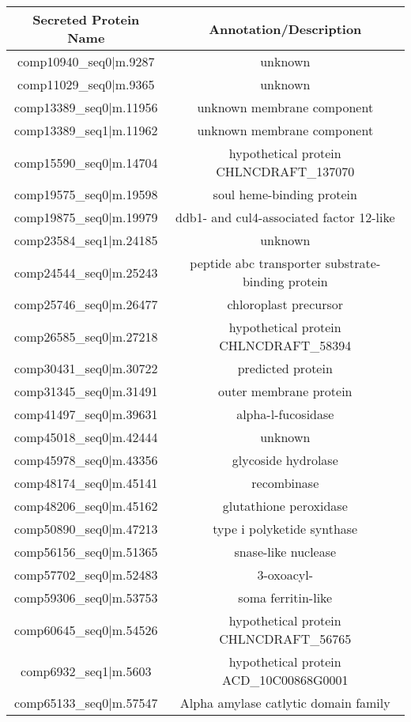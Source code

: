 \begin{table}
    \centering
    \begin{tabular}{|c|c|}
        \hline
        \textbf{Secreted Protein Name} & \textbf{Annotation/Description} \\
        \hline
        comp10940\_seq0|m.9287  &  unknown \\
        comp11029\_seq0|m.9365  &  unknown\\
        comp13389\_seq0|m.11956 &  unknown membrane component \\
        comp13389\_seq1|m.11962 &  unknown membrane component \\
        comp15590\_seq0|m.14704 &  hypothetical protein CHLNCDRAFT\_137070\\
        comp19575\_seq0|m.19598 &  soul heme-binding protein\\
        comp19875\_seq0|m.19979 &  ddb1- and cul4-associated factor 12-like\\
        comp23584\_seq1|m.24185 &  unknown\\
        comp24544\_seq0|m.25243 &  peptide abc transporter substrate-binding protein\\
        comp25746\_seq0|m.26477 &  chloroplast precursor\\
        comp26585\_seq0|m.27218 &  hypothetical protein CHLNCDRAFT\_58394\\
        comp30431\_seq0|m.30722 &  predicted protein\\
        comp31345\_seq0|m.31491 &  outer membrane protein\\
        comp41497\_seq0|m.39631 &  alpha-l-fucosidase\\
        comp45018\_seq0|m.42444 &  unknown \\ 
        comp45978\_seq0|m.43356 &  glycoside hydrolase\\
        comp48174\_seq0|m.45141 &  recombinase\\
        comp48206\_seq0|m.45162 &  glutathione peroxidase\\
        comp50890\_seq0|m.47213 &  type i polyketide synthase\\
        comp56156\_seq0|m.51365 &  snase-like nuclease\\
        comp57702\_seq0|m.52483 &  3-oxoacyl-\\
        comp59306\_seq0|m.53753 &  soma ferritin-like\\
        comp60645\_seq0|m.54526 &  hypothetical protein CHLNCDRAFT\_56765\\
        comp6932\_seq1|m.5603    & hypothetical protein ACD\_10C00868G0001\\
        comp65133\_seq0|m.57547    & Alpha amylase catlytic domain family \\
        \hline
    \end{tabular}
\end{table}


